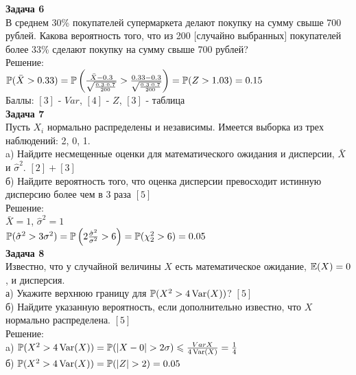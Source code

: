 \documentclass[12pt, a4paper]{article}\usepackage[]{graphicx}\usepackage[]{color}
\begin{document}
\textbf{Задача 6} \\ %
В среднем 30\% покупателей супермаркета делают покупку на сумму
свыше 700 рублей. Какова вероятность того, что из 200 $[$случайно
выбранных$]$ покупателей
более 33\% сделают покупку на сумму свыше 700 рублей? \\
Решение: \\
$\P(\bar{X}>0.33)=\P\left(\frac{\bar{X}-0.3}{\sqrt{\frac{0.3\cdot
0.7}{200}}}>\frac{0.33-0.3}{\sqrt{\frac{0.3\cdot
0.7}{200}}}\right)=\P(Z>1.03)=0.15$ \\
Баллы: $[3]$ - $Var$, $[4]$ - $Z$, $[3]$ - таблица \\


\textbf{Задача 7} \\ %
Пусть $X_{i}$ нормально распределены и
независимы. Имеется выборка
из трех наблюдений: 2, 0, 1. \\
a) Найдите несмещенные оценки для математического ожидания и
дисперсии, $\bar{X}$ и $\hat{\sigma}^{2}$. $[2]+[3]$\\
б) Найдите вероятность того, что оценка дисперсии превосходит
истинную дисперсию более чем в 3 раза $[5]$\\
Решение: \\
$\bar{X}=1$, $\hat{\sigma}^{2}=1$ \\
$\P(\hat{\sigma}^{2}>3\sigma^{2})=\P\left(2\frac{\hat{\sigma}^{2}}{\sigma^{2}}>6\right)=\P(\chi_{2}^{2}>6)=0.05$
\\


\textbf{Задача 8} \\ %
Известно, что у случайной величины $X$ есть
математическое
ожидание, $\E(X)=0$, и дисперсия. \\
а) Укажите верхнюю границу для $\P(X^{2}>4\Var(X))$? $[5]$\\
б) Найдите указанную вероятность, если дополнительно известно, что
$X$ нормально распределена. $[5]$\\
Решение: \\
a) $\P(X^{2}>4\Var(X))=\P(|X-0|>2\sigma)\le
\frac{Var{X}}{4\Var(X)}=\frac{1}{4}$ \\
б) $\P(X^{2}>4\Var(X))=\P(|Z|>2)=0.05$ \\
\end{document}
